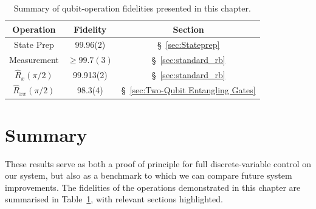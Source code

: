 \begin{table}[]
    \centering
    \begin{tabular}{c|c|c}
         Operation & Fidelity & Section \\
         \hline\hline
         State Prep &99.96(2)& \S~\ref{sec:Stateprep}\\
         Measurement &$ \ge 99.7(3)$& \S~\ref{sec:standard_rb}\\
         $\hat R_x(\pi/2)$ & 99.913(2) & \S~\ref{sec:standard_rb}\\
         $\hat R_{xx}(\pi/2)$ & 98.3(4) & \S~\ref{sec:Two-Qubit Entangling Gates}\\
    \end{tabular}
    \caption{
        Summary of qubit-operation fidelities presented in this chapter.
    }
    \label{tab:fidelities}
\end{table}
\section{Summary}
    These results serve as both a proof of principle for full discrete-variable control on
    our system, but also as a benchmark to which we can compare future system
    improvements. The fidelities of the operations demonstrated in this chapter are summarised in Table~\ref{tab:fidelities}, with relevant sections highlighted.

    